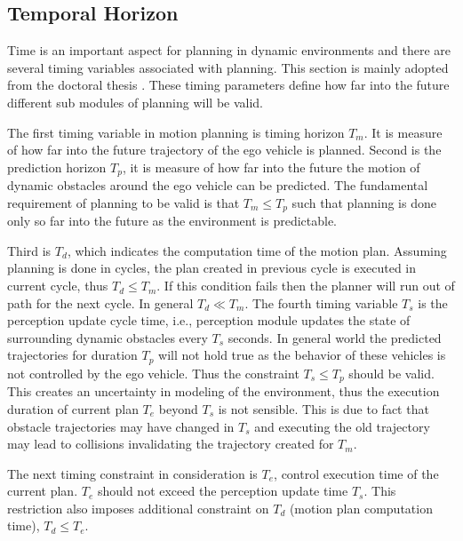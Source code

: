 \subsection{Temporal Horizon} \label{timing_constraints}
Time is an important aspect for planning in dynamic environments and there are several timing variables associated with planning. This section is mainly adopted from the doctoral thesis \cite{eth_timing_constraints}. These timing parameters define how far into the future different sub modules of planning will be valid. 

The first timing variable in motion planning is timing horizon $ T_m $. It is measure of how far into the future trajectory of the ego vehicle is planned. Second is the prediction horizon $ T_p $, it is measure of how far into the future the motion of dynamic obstacles around the ego vehicle can be predicted. The fundamental requirement of planning to be valid is that $ T_m  \le  T_p $ such that planning is done only so far into the future as the environment is predictable. 

Third is $ T_d $, which indicates the computation time of the motion plan. Assuming planning is done in cycles, the plan created in previous cycle is executed in current cycle, thus $ T_d  \le  T_m $. If this condition fails then the planner will run out of path for the next cycle. In general $ T_d \ll T_m $. The fourth timing variable $ T_s $ is the perception update cycle time, i.e., perception module updates the state of surrounding dynamic obstacles every $ T_s $ seconds. In general world the predicted trajectories for duration $ T_p $ will not hold true as the behavior of these vehicles is not controlled by the ego vehicle. Thus the constraint $ T_s  \le T_p $ should be valid. This creates an uncertainty in modeling of the environment, thus the execution duration of current plan $ T_e $ beyond $ T_s $ is not sensible. This is due to fact that obstacle trajectories may have changed in $ T_s $ and executing the old trajectory may lead to collisions invalidating the trajectory created for $ T_m $. 


The next timing constraint in consideration is $ T_e $, control execution time of the current plan. $ T_e $ should not exceed the perception update time $ T_s $. This restriction also imposes additional constraint on $ T_d $ (motion plan computation time), $ T_d \le T_e $. 

